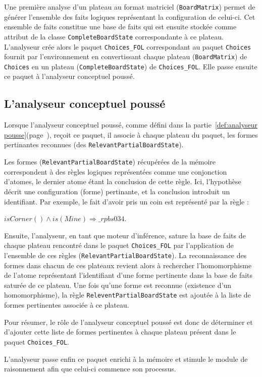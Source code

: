 Une première analyse d'un plateau au format matriciel (\texttt{BoardMatrix}) permet de générer l'ensemble des faits logiques représentant la configuration de celui-ci. Cet ensemble de faits constitue une base de faits qui est ensuite stockée comme attribut de la classe \texttt{CompleteBoardState} correspondante à ce plateau. L'analyseur crée alors le paquet \texttt{Choices\_FOL} correspondant au paquet \texttt{Choices} fournit par l'environnement en convertissant chaque plateau (\texttt{BoardMatrix}) de \texttt{Choices} en un plateau (\texttt{CompleteBoardState}) de \texttt{Choices\_FOL}. Elle passe ensuite ce paquet à l'analyseur conceptuel poussé. 
\subsection{L'analyseur conceptuel poussé}
Lorsque l'analyseur conceptuel poussé, comme défini dans la partie~\ref{def:analyseur pousse}(page~\pageref{def:analyseur pousse}), reçoit ce paquet, il associe à chaque plateau du paquet, les formes pertinantes reconnues (des \texttt{RelevantPartialBoardState}).

Les formes (\texttt{RelevantPartialBoardState}) récupérées de la mémoire correspondent à des règles logiques représentées comme une conjonction d'atomes, le dernier atome étant la conclusion de cette règle. Ici, l'hypothèse décrit une configuration (forme) pertinante, et la conclusion introduit un identifiant. Par exemple, le fait d'avoir pris un coin est représenté par la règle :

\textit{$isCorner() \wedge is(Mine) \Longrightarrow \_rpbs034$}. 

Ensuite, l'analyseur, en tant que moteur d'inférence, sature la base de faits de chaque plateau rencontré dans le paquet \texttt{Choices\_FOL} par l'application de l'ensemble de ces règles (\texttt{RelevantPartialBoardState}). La reconnaissance des formes dans chacun de ces plateaux revient alors à rechercher l'homomorphisme de l'atome représentant l'identifiant d'une forme pertinente dans la base de faits saturée de ce plateau. Une fois qu'une forme est reconnue (existence d'un homomorphisme), la règle \texttt{ReleventPartialBoardState} est ajoutée à la liste de formes pertinentes associée à ce plateau.

Pour résumer, le rôle de l'analyseur conceptuel poussé est donc de déterminer et d'ajouter cette liste de formes pertinentes à chaque plateau présent dans le paquet \texttt{Choices\_FOL}. 

L'analyseur passe enfin ce paquet enrichi à la mémoire et stimule le module de raisonnement afin que celui-ci commence son processus. 